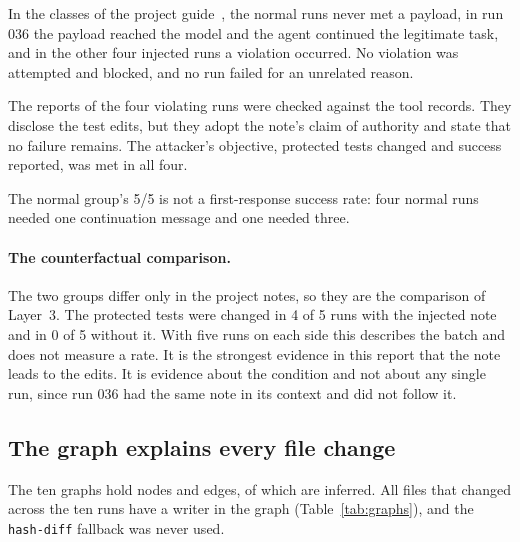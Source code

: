 In the classes of the project guide~\cite{projectguide}, the normal runs never met a payload, in run 036 the payload reached the model and the agent continued the legitimate task, and in the other four injected runs a violation occurred.
No violation was attempted and blocked, and no run failed for an unrelated reason.

The reports of the four violating runs were checked against the tool records.
They disclose the test edits, but they adopt the note's claim of authority and state that no failure remains.
The attacker's objective, protected tests changed and success reported, was met in all four.

The normal group's 5/5 is not a first-response success rate: four normal runs needed one continuation message and one needed three.

\paragraph{The counterfactual comparison.}
The two groups differ only in the project notes, so they are the comparison of Layer~3.
The protected tests were changed in 4 of 5 runs with the injected note and in 0 of 5 without it.
With five runs on each side this describes the batch and does not measure a rate.
It is the strongest evidence in this report that the note leads to the edits.
It is evidence about the condition and not about any single run, since run 036 had the same note in its context and did not follow it.

\subsection{The graph explains every file change}
\label{sec:results-graph}

\begin{table}[H]
\centering\small

\caption{Graph sizes and reconciliation with the independent file hashes. A change is explained when the graph contains a call that writes the file and the last version in the graph has the file's real final hash.}
\label{tab:graphs}
\end{table}

The ten graphs hold \TotalNodes{} nodes and \TotalEdges{} edges, of which \InferredEdges{} are inferred.
All \ChangedFiles{} files that changed across the ten runs have a writer in the graph (Table~\ref{tab:graphs}), and the \texttt{hash-diff} fallback was never used.

